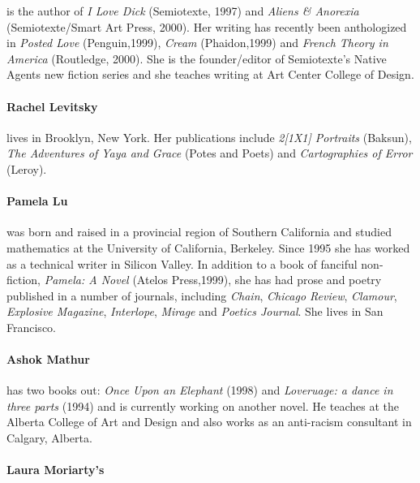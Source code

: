 \documentclass[
]{memoir}
\begin{document}
is the author of \emph{I Love Dick} (Semiotexte, 1997) and \emph{Aliens
\& Anorexia} (Semiotexte/Smart Art Press, 2000). Her writing has
recently been anthologized in \emph{Posted Love} (Penguin,1999),
\emph{Cream} (Phaidon,1999) and \emph{French Theory in America}
(Routledge, 2000). She is the founder/editor of Semiotexte's Native
Agents new fiction series and she teaches writing at Art Center College
of Design.

\hypertarget{rachel-levitsky}{%
\paragraph{Rachel Levitsky}\label{rachel-levitsky}}

lives in Brooklyn, New York. Her publications include \emph{2{[}1X1{]}
Portraits} (Baksun), \emph{The Adventures of Yaya and Grace} (Potes and
Poets) and \emph{Cartographies of Error} (Leroy).

\hypertarget{pamela-lu}{%
\paragraph{Pamela Lu}\label{pamela-lu}}

was born and raised in a provincial region of Southern California and
studied mathematics at the University of California, Berkeley. Since
1995 she has worked as a technical writer in Silicon Valley. In addition
to a book of fanciful non-fiction, \emph{Pamela: A Novel} (Atelos
Press,1999), she has had prose and poetry published in a number of
journals, including \emph{Chain}, \emph{Chicago Review}, \emph{Clamour},
\emph{Explosive Magazine}, \emph{Interlope}, \emph{Mirage} and
\emph{Poetics Journal}. She lives in San Francisco.

\hypertarget{ashok-mathur}{%
\paragraph{Ashok Mathur}\label{ashok-mathur}}

has two books out: \emph{Once Upon an Elephant} (1998) and
\emph{Loveruage: a dance in three parts} (1994) and is currently working
on another novel. He teaches at the Alberta College of Art and Design
and also works as an anti-racism consultant in Calgary, Alberta.

\hypertarget{laura-moriartys}{%
\paragraph{Laura Moriarty's}\label{laura-moriartys}}
\end{document}
